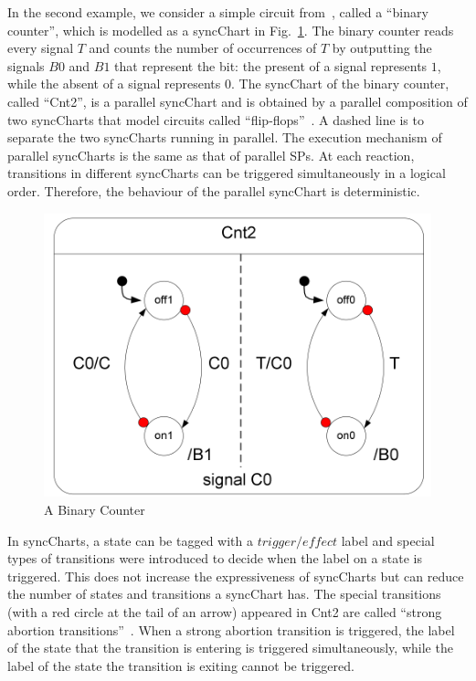 \documentclass{fcs}
\begin{document}
In the second example, we consider a simple circuit from~\cite{Andre03}, called a ``binary counter'',  which is modelled as a syncChart in Fig.~\ref{figure:A Binary Counter}.
The binary counter reads every signal $T$ and counts the number of occurrences of $T$ by outputting the signals $B0$ and $B1$ that represent the bit:
the present of a signal represents $1$, while the absent of a signal represents $0$.
The syncChart of the binary counter, called ``Cnt2'', is a parallel syncChart and is obtained by a parallel composition of two syncCharts that model circuits called ``flip-flops''~\cite{Andre03}.
A dashed line is to separate the two syncCharts running in parallel.
The execution mechanism of parallel syncCharts is the same as that of parallel SPs.
At each reaction, transitions in different syncCharts can be triggered simultaneously in a logical order.
Therefore, the behaviour of the parallel syncChart is deterministic.

\begin{figure}[htpb]
        \centering
        \includegraphics[width=0.5\linewidth]{figures/example2.png}
        \caption{A Binary Counter}
        \label{figure:A Binary Counter}
    \end{figure}


In syncCharts, a state can be tagged with a $\mathit{trigger}/\mathit{effect}$ label and
special types of transitions were introduced to decide when the label on a state is triggered.
This does not increase the expressiveness of syncCharts but can reduce the number of states and transitions a syncChart has.
The special transitions (with a red circle at the tail of an arrow) appeared in Cnt2 are called ``strong abortion transitions''~\cite{Andre03}.
When a strong abortion transition is triggered, the label of the state that the transition is entering is triggered simultaneously, while the label of the state the transition is exiting cannot be triggered.
\end{document}
